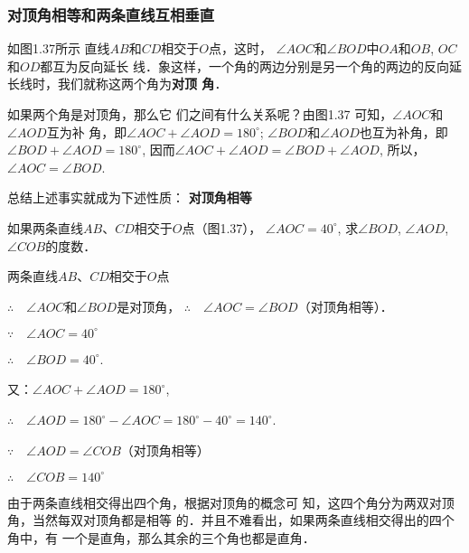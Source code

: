 \subsubsection{对顶角相等和两条直线互相垂直}

如图1.37所示 直线$AB$和$CD$相交于$O$点，这时，
$\angle AOC$和$\angle BOD$中$OA$和$OB$, $OC$和$OD$都互为反向延长
线．象这样，一个角的两边分别是另一个角的两边的反向延
长线时，我们就称这两个角为\textbf{对顶
角}．

如果两个角是对顶角，那么它
们之间有什么关系呢？由图1.37
可知，$\angle AOC$和$\angle AOD$互为补
角，即$\angle AOC+\angle AOD=180^{\circ}$;
$\angle BOD$和$\angle AOD$也互为补角，即$\angle BOD+\angle AOD=180^{\circ}$,
因而$\angle AOC+\angle AOD=\angle BOD+\angle AOD$, 所以，$\angle AOC=\angle BOD$.

总结上述事实就成为下述性质：
\textbf{对顶角相等}

\begin{example}
	如果两条直线$AB$、$CD$相交于$O$点（图1.37），
$\angle AOC=40^{\circ}$, 求$\angle BOD$, $\angle AOD$, $\angle COB$的度数．
\end{example}

\begin{figure}[htp]
	\centering
{}
	\caption{}
\end{figure}

\begin{solution}
	两条直线$AB$、$CD$相交于$O$点

$\therefore\quad \angle AOC$和$\angle BOD$是对顶角，
$\therefore\quad \angle AOC=\angle BOD$（对顶角相等）．

$\because\quad \angle AOC=40^{\circ}$

$\therefore\quad \angle BOD=40^{\circ}$.

又：$\angle AOC+\angle AOD=180^{\circ}$,

$\therefore\quad \angle AOD=180^{\circ}-\angle AOC=180^{\circ}-40^{\circ}=140^{\circ}$.

$\because\quad \angle AOD=\angle COB$（对顶角相等）

$\therefore\quad \angle COB=140^{\circ}$
\end{solution}


由于两条直线相交得出四个角，根据对顶角的概念可
知，这四个角分为两双对顶角，当然每双对顶角都是相等
的．并且不难看出，如果两条直线相交得出的四个角中，有
一个是直角，那么其余的三个角也都是直角．

